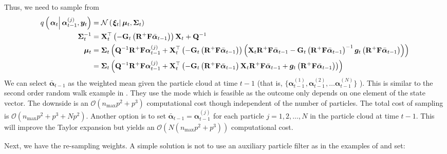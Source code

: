 \documentclass[9pt, notitlepage]{article}
\renewcommand{\vec}[1]{\bm{#1}}
\newcommand{\vecb}[1]{\bar{\vec{#1}}}
\newcommand{\mat}[1]{\mathbf{#1}}
\newcommand{\Lparen}[1]{\left( #1\right)}
\newcommand{\Cond}[2]{\left. #1 \vphantom{#2} \right\vert  #2}
\newcommand{\optor}[2]{#1\Lparen{#2}}
\newcommand{\optorC}[3]{\optor{#1}{\Cond{#2}{#3}}}
\newcommand{\normalC}[3]{\optorC{\mathcal{N}}{#1}{#2,#3}}
\newcommand{\IDC}[2]{\optorC{q}{#1}{#2}}
\newcommand{\partic}[3]{#1_{#2}^{\Lparen{#3}}}
\newcommand{\bigO}[1]{\mathcal{O}\Lparen{#1}}
\newcommand{\dimState}{p}
\newcommand{\nPart}{N}
\newcommand{\nMax}{n_{\text{max}}}
\begin{document}
%
%
Thus, we need to sample from%
%
{\scriptsize %
\begin{equation}\label{eqn:TaylorProposalForward}\begin{split}
	\IDC{\vec{\alpha}_t}{\partic{\vec{\alpha}}{t-1}{j}, \vec{y}_t} &=  %
		\normalC{\vec{\xi}_t}{\vec{\mu}_t}{\mat{\Sigma}_t} \\
%
	\mat{\Sigma}_t^{-1} &= \mat{X}_t^\top
		\Lparen{-\mat{G}_t\Lparen{\mat{R}^{+}\mat{F}\vecb{\alpha}_{t - 1}}}
		\mat{X}_t + \mat{Q}^{-1}  \\
%
	\vec{\mu}_t &= \mat{\Sigma}_t\Lparen{
		\mat{Q}^{-1}\mat{R}^{+}\mat{F}\partic{\vec{\alpha}}{t-1}{j} +
		\mat{X}_t^\top \Lparen{-\mat{G}_t\Lparen{\mat{R}^{+}\mat{F}\vecb{\alpha}_{t - 1}}}
		\Lparen{
			\mat{X}_t\mat{R}^{+}\mat{F}\vecb{\alpha}_{t - 1} -
			\mat{G}_t\Lparen{\mat{R}^{+}\mat{F}\vecb{\alpha}_{t - 1}}^{-1}
			\vec{g}_t\Lparen{\mat{R}^{+}\mat{F}\vecb{\alpha}_{t - 1}}
		}
	} \\
%
	 &= \mat{\Sigma}_t\Lparen{
		\mat{Q}^{-1}\mat{R}^{+}\mat{F}\partic{\vec{\alpha}}{t-1}{j} +
		\mat{X}_t^\top
		\Lparen{
			-\mat{G}_t\Lparen{\mat{R}^{+}\mat{F}\vecb{\alpha}_{t - 1}}
			\mat{X}_t\mat{R}^{+}\mat{F}\vecb{\alpha}_{t - 1} +
			\vec{g}_t\Lparen{\mat{R}^{+}\mat{F}\vecb{\alpha}_{t - 1}}
		}
	}
\end{split}\end{equation}
}%
%
%
We can select  $\vecb{\alpha}_{t - 1}$ as the weighted mean given the particle cloud at time $t-1$ (that is, %
$\{\partic{\vec{\alpha}}{t-1}{1}, \partic{\vec{\alpha}}{t-1}{2}, \dots \partic{\vec{\alpha}}{t-1}{\nPart}\}$%
). This is similar to the second order random walk example in \cite{fearnhead10}. They use the mode which is feasible as the outcome only depends on one element of the state vector. The downside is an $\bigO{\nMax \dimState^2+\dimState^3}$ computational cost though independent of the number of particles. The total cost of sampling is $\bigO{\nMax\dimState^2+\dimState^3 + \nPart\dimState^2}$. Another option is to set $\vecb{\alpha}_{t - 1} = \partic{\vec{\alpha}}{t-1}{j}$ for each particle $j = 1, 2, \dots, \nPart$ in the particle cloud at time $t - 1$. This will improve the Taylor expansion but yields an $\bigO{\nPart\Lparen{\nMax\dimState^2+\dimState^3}}$ computational cost.

Next, we have the re-sampling weights. A simple solution is not to use an auxiliary particle filter as in the examples of \cite{fearnhead10} and set:
\end{document}
